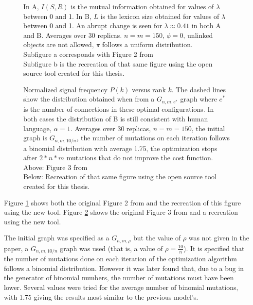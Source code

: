 \begin{figure}
  \caption{
    In A, $I(S,R)$ is the mutual information obtained for values of $\lambda$ between 0 and 1.
    In B, $L$ is the lexicon size obtained for values of $\lambda$ between 0 and 1.
    An abrupt change is seen for $\lambda \approx 0.41$ in both A and B.
    Averages over 30 replicas.
    $n=m=150$, $\phi=0$, unlinked objects are not allowed, $\pi$ follows a uniform distribution.\\
    Subfigure a corresponds with Figure 2 from \cite{Ferrer2003a}\\
    Subfigure b is the recreation of that same figure using the open source tool created for this thesis.
  }
  \label{fig:fig2_2003}
\end{figure}

\begin{figure}
  \caption{
    Normalized signal frequency $P(k)$ versus rank $k$.
    The dashed lines show the distribution obtained when from a $G_{n,m,e^*}$ graph where $e^*$ is the number of connections in these optimal configurations.
    In both cases the distribution of B is still consistent with human language, $\alpha=1$.
    Averages over 30 replicas, $n=m=150$, the initial graph is $G_{n,m,10/n}$, the number of mutations on each iteration follows a binomial distribution with average 1.75, the optimization stops after $2*n*m$ mutations that do not improve the cost function.\\
    Above: Figure 3 from \cite{Ferrer2003a}\\
    Below: Recreation of that same figure using the open source tool created for this thesis.
  }
  \label{fig:fig3_2003}
\end{figure}

Figure \ref{fig:fig2_2003} shows both the original Figure 2 from \cite{Ferrer2003a} and the recreation of this figure using the new tool.
Figure \ref{fig:fig3_2003} shows the original Figure 3 from \cite{Ferrer2003a} and a recreation using the new tool.

The initial graph was specified as a $G_{n,m,\rho}$ but the value of $\rho$ was not given in the paper, a $G_{n,m,10/n}$ graph was used (that is, a value of $\rho=\frac{10}{n}$).
It is specified that the number of mutations done on each iteration of the optimization algorithm follows a binomial distribution.
However it was later found that, due to a bug in the generator of binomial numbers, the number of mutations must have been lower.
Several values were tried for the average number of binomial mutations, with 1.75 giving the results most similar to the previous model's.

